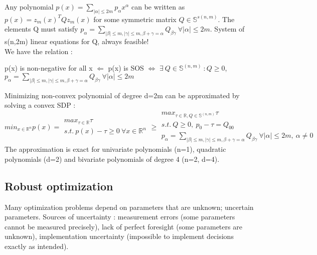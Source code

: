 \documentclass[../main.tex]{subfiles}
\begin{document}
Any polynomial $p(x) = \sum_{\lvert \alpha \rvert \leq 2m} p_\alpha x^\alpha$ can be written as $p(x) = z_m(x)^T Q z_m(x)$ for some symmetric matrix $Q\in \mathbb{S}^{s(n,m)}$. The elements Q must satisfy $p_\alpha = \sum_{\lvert \beta \rvert \leq m, \lvert \gamma \rvert \leq m, \beta + \gamma = \alpha} Q_{\beta \gamma} \: \forall \lvert \alpha \rvert \leq 2m$. System of s(n,2m) linear equations for Q, always feasible!\\
We have the relation : \begin{center}
    p(x) is non-negative for all x $\Leftarrow$ p(x) is SOS $\Leftrightarrow$ $\exists \: Q \in\mathbb{S}^{(n,m)} \: : Q \geq 0 $, $p_{\alpha} = \sum_{\lvert \beta\rvert \leq m, \lvert \gamma \rvert \leq m, \beta + \gamma = \alpha} Q_{\beta \gamma}  \: \forall \lvert \alpha \rvert \leq 2m$
\end{center}

Minimizing  non-convex polynomial of degree d=2m can be approximated by solving a convex SDP : \begin{equation}
    min_{x\in \mathbb{R}^n} p(x) = \begin{matrix}max_{\tau \in \mathbb{R}} \tau\\
    s.t. \: p(x)-\tau \geq 0 \: \forall x \in \mathbb{R}^n
    \end{matrix} \geq \begin{matrix}
        max_{\tau\in \mathbb{R}, Q\in \mathbb{S}^{(n,m)}} \tau\\
        s.t. \: Q\geq 0, \: p_0-\tau = Q_{00}\\
        p_{\alpha} = \sum_{\lvert \beta\rvert \leq m, \lvert \gamma \rvert \leq m, \beta + \gamma = \alpha} Q_{\beta \gamma}  \: \forall \lvert \alpha \rvert \leq 2m, \: \alpha\neq 0
    \end{matrix}
\end{equation}
The approximation is exact for univariate polynomials (n=1), quadratic polynomials (d=2) and bivariate polynomials of degree 4 (n=2, d=4).\\

\subsection{Robust optimization}
Many optimization problems depend on parameters that are unknown; uncertain parameters. Sources of uncertainty : measurement errors (some parameters cannot be measured precisely), lack of perfect foresight (some parameters are unknown), implementation uncertainty (impossible to implement decisions exactly as intended). \\
\end{document}
